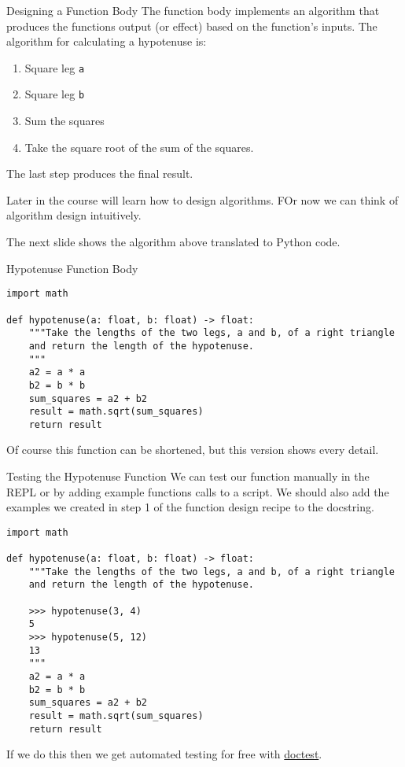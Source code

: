 \documentclass[smaller, aspectratio=1610]{beamer}
\begin{document}
\begin{frame}[label={sec:orgf51ec52},fragile]{Designing a Function Body}
 The function body implements an algorithm that produces the functions output (or effect) based on the function's inputs.  The algorithm for calculating a hypotenuse is:

\begin{enumerate}
\item Square leg \texttt{a}
\item Square leg \texttt{b}
\item Sum the squares
\item Take the square root of the sum of the squares.
\end{enumerate}

The last step produces the final result.

Later in the course will learn how to design algorithms.  FOr now we can think of algorithm design intuitively.

The next slide shows the algorithm above translated to Python code.
\end{frame}

\begin{frame}[label={sec:orgde8e9db},fragile]{Hypotenuse Function Body}
 \lstset{language=Python,label= ,caption= ,captionpos=b,numbers=none}
\begin{lstlisting}
import math

def hypotenuse(a: float, b: float) -> float:
    """Take the lengths of the two legs, a and b, of a right triangle
    and return the length of the hypotenuse.
    """
    a2 = a * a
    b2 = b * b
    sum_squares = a2 + b2
    result = math.sqrt(sum_squares)
    return result
\end{lstlisting}

Of course this function can be shortened, but this version shows every detail.
\end{frame}

\begin{frame}[label={sec:org5a0ae7d},fragile]{Testing the Hypotenuse Function}
 We can test our function manually in the REPL or by adding example functions calls to a script.  We should also add the examples we created in step 1 of the function design recipe to the docstring.

\lstset{language=Python,label= ,caption= ,captionpos=b,numbers=none}
\begin{lstlisting}
import math

def hypotenuse(a: float, b: float) -> float:
    """Take the lengths of the two legs, a and b, of a right triangle
    and return the length of the hypotenuse.

    >>> hypotenuse(3, 4)
    5
    >>> hypotenuse(5, 12)
    13
    """
    a2 = a * a
    b2 = b * b
    sum_squares = a2 + b2
    result = math.sqrt(sum_squares)
    return result
\end{lstlisting}

If we do this then we get automated testing for free with \href{https://docs.python.org/3/library/doctest.html}{doctest}.
\end{frame}
\end{document}

